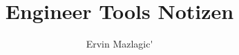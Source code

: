 \documentclass[a4paper,
               10pt,
               fleqn]{article}
\author{Ervin Mazlagic\'}
\title{Engineer Tools Notizen}
\begin{document}
\tableofcontents







\lstlistoflistings
\end{document}
